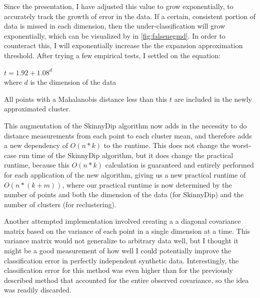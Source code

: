 \documentclass{sig-alternate-05-2015}
\begin{document}
Since the presentation, I have adjusted this value to grow exponentially, to accurately track the growth of error in the data. If a certain, consistent portion of data is missed in each dimension, then the under-classification will grow exponentially, which can be visualized by in \ref{fig:falsenegmd}. In order to counteract this, I will exponentially increase the the expansion approximation threshold. After trying a few empirical tests, I settled on the equation: \\
\begin{center}
$t = 1.92+1.08^d$ \\
where $d$ is the dimension of the data
\end{center}
All points with a Mahalanobis distance less than this $t$ are included in the newly approximated cluster.

This augmentation of the SkinnyDip algorithm now adds in the necessity to do distance measurements from each point to each cluster mean, and therefore adds a new dependency of $O(n*k)$ to the runtime. This does not change the worst-case run time of the SkinnyDip algorithm, but it does change the practical runtime, because this $O(n*k)$ calculation is guaranteed and entirely performed for each application of the new algorithm, giving us a new practical runtime of $O(n*(k+m))$, where our practical runtime is now determined by the number of points and both the dimension of the data (for SkinnyDip) and the number of clusters (for reclustering).

Another attempted implementation involved creating a a diagonal covariance matrix based on the variance of each point in a single dimension at a time. This variance matrix would not generalize to arbitrary data well, but I thought it might be a good measurement of how well I could potentially improve the classification error in perfectly independent synthetic data. Interestingly, the classification error for this method was even higher than for the previously described method that accounted for the entire observed covariance, so the idea was readily discarded.
\end{document}
